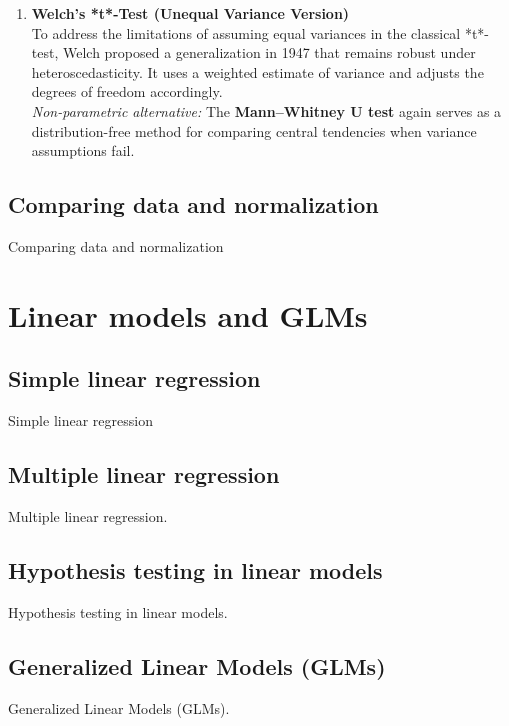 \documentclass{book}
\begin{document}
\begin{enumerate}
\item \textbf{Welch’s *t*-Test (Unequal Variance Version)}\\
To address the limitations of assuming equal variances in the classical *t*-test, Welch proposed a generalization in 1947 \cite{welch1947} that remains robust under heteroscedasticity. It uses a weighted estimate of variance and adjusts the degrees of freedom accordingly.\\
\textit{Non-parametric alternative:} The \textbf{Mann–Whitney U test} again serves as a distribution-free method for comparing central tendencies when variance assumptions fail.

\end{enumerate}

\newpage

\section{Comparing data and normalization}

Comparing data and normalization


\chapter{Linear models and GLMs}

\section{Simple linear regression}
Simple linear regression

\newpage

\section{Multiple linear regression}
Multiple linear regression.

\newpage

\section{Hypothesis testing in linear models}
Hypothesis testing in linear models.

\newpage

\section{Generalized Linear Models (GLMs)}
Generalized Linear Models (GLMs).
\end{document}
